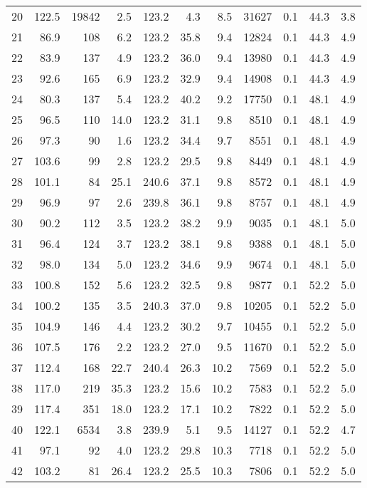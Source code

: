 \begin{tabular}{|r|rrrrr|rrrrr|}
20 & 122.5 & 19842 & 2.5 & 123.2 & 4.3 & 8.5 & 31627 & 0.1 & 44.3 & 3.8 \\
21 & 86.9 & 108 & 6.2 & 123.2 & 35.8 & 9.4 & 12824 & 0.1 & 44.3 & 4.9 \\
22 & 83.9 & 137 & 4.9 & 123.2 & 36.0 & 9.4 & 13980 & 0.1 & 44.3 & 4.9 \\
23 & 92.6 & 165 & 6.9 & 123.2 & 32.9 & 9.4 & 14908 & 0.1 & 44.3 & 4.9 \\
24 & 80.3 & 137 & 5.4 & 123.2 & 40.2 & 9.2 & 17750 & 0.1 & 48.1 & 4.9 \\
25 & 96.5 & 110 & 14.0 & 123.2 & 31.1 & 9.8 & 8510 & 0.1 & 48.1 & 4.9 \\
26 & 97.3 & 90 & 1.6 & 123.2 & 34.4 & 9.7 & 8551 & 0.1 & 48.1 & 4.9 \\
27 & 103.6 & 99 & 2.8 & 123.2 & 29.5 & 9.8 & 8449 & 0.1 & 48.1 & 4.9 \\
28 & 101.1 & 84 & 25.1 & 240.6 & 37.1 & 9.8 & 8572 & 0.1 & 48.1 & 4.9 \\
29 & 96.9 & 97 & 2.6 & 239.8 & 36.1 & 9.8 & 8757 & 0.1 & 48.1 & 4.9 \\
30 & 90.2 & 112 & 3.5 & 123.2 & 38.2 & 9.9 & 9035 & 0.1 & 48.1 & 5.0 \\
31 & 96.4 & 124 & 3.7 & 123.2 & 38.1 & 9.8 & 9388 & 0.1 & 48.1 & 5.0 \\
32 & 98.0 & 134 & 5.0 & 123.2 & 34.6 & 9.9 & 9674 & 0.1 & 48.1 & 5.0 \\
33 & 100.8 & 152 & 5.6 & 123.2 & 32.5 & 9.8 & 9877 & 0.1 & 52.2 & 5.0 \\
34 & 100.2 & 135 & 3.5 & 240.3 & 37.0 & 9.8 & 10205 & 0.1 & 52.2 & 5.0 \\
35 & 104.9 & 146 & 4.4 & 123.2 & 30.2 & 9.7 & 10455 & 0.1 & 52.2 & 5.0 \\
36 & 107.5 & 176 & 2.2 & 123.2 & 27.0 & 9.5 & 11670 & 0.1 & 52.2 & 5.0 \\
37 & 112.4 & 168 & 22.7 & 240.4 & 26.3 & 10.2 & 7569 & 0.1 & 52.2 & 5.0 \\
38 & 117.0 & 219 & 35.3 & 123.2 & 15.6 & 10.2 & 7583 & 0.1 & 52.2 & 5.0 \\
39 & 117.4 & 351 & 18.0 & 123.2 & 17.1 & 10.2 & 7822 & 0.1 & 52.2 & 5.0 \\
40 & 122.1 & 6534 & 3.8 & 239.9 & 5.1 & 9.5 & 14127 & 0.1 & 52.2 & 4.7 \\
41 & 97.1 & 92 & 4.0 & 123.2 & 29.8 & 10.3 & 7718 & 0.1 & 52.2 & 5.0 \\
42 & 103.2 & 81 & 26.4 & 123.2 & 25.5 & 10.3 & 7806 & 0.1 & 52.2 & 5.0 \\

\end{tabular}
